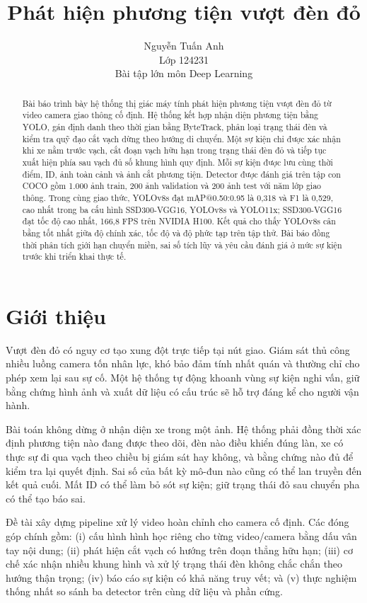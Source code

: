 \documentclass[11pt,a4paper]{article}
\title{Phát hiện phương tiện vượt đèn đỏ}
\author{Nguyễn Tuấn Anh \\
Lớp 124231 \\
Bài tập lớn môn Deep Learning}
\begin{document}
\maketitle
\pagestyle{plain}
\thispagestyle{plain}

\renewcommand{\abstractname}{Abstract}
\begin{abstract}
Bài báo trình bày hệ thống thị giác máy tính phát hiện phương tiện vượt đèn đỏ từ video camera giao thông cố định. Hệ thống kết hợp nhận diện phương tiện bằng YOLO, gán định danh theo thời gian bằng ByteTrack, phân loại trạng thái đèn và kiểm tra quỹ đạo cắt vạch dừng theo hướng di chuyển. Một sự kiện chỉ được xác nhận khi xe nằm trước vạch, cắt đoạn vạch hữu hạn trong trạng thái đèn đỏ và tiếp tục xuất hiện phía sau vạch đủ số khung hình quy định. Mỗi sự kiện được lưu cùng thời điểm, ID, ảnh toàn cảnh và ảnh cắt phương tiện. Detector được đánh giá trên tập con COCO gồm 1.000 ảnh train, 200 ảnh validation và 200 ảnh test với năm lớp giao thông. Trong cùng giao thức, YOLOv8s đạt mAP@0.50:0.95 là 0,318 và F1 là 0,529, cao nhất trong ba cấu hình SSD300-VGG16, YOLOv8s và YOLO11x; SSD300-VGG16 đạt tốc độ cao nhất, 166,8 FPS trên NVIDIA H100. Kết quả cho thấy YOLOv8s cân bằng tốt nhất giữa độ chính xác, tốc độ và độ phức tạp trên tập thử. Bài báo đồng thời phân tích giới hạn chuyển miền, sai số tích lũy và yêu cầu đánh giá ở mức sự kiện trước khi triển khai thực tế.
\end{abstract}

\section{Giới thiệu}
Vượt đèn đỏ có nguy cơ tạo xung đột trực tiếp tại nút giao. Giám sát thủ công nhiều luồng camera tốn nhân lực, khó bảo đảm tính nhất quán và thường chỉ cho phép xem lại sau sự cố. Một hệ thống tự động khoanh vùng sự kiện nghi vấn, giữ bằng chứng hình ảnh và xuất dữ liệu có cấu trúc sẽ hỗ trợ đáng kể cho người vận hành.

Bài toán không dừng ở nhận diện xe trong một ảnh. Hệ thống phải đồng thời xác định phương tiện nào đang được theo dõi, đèn nào điều khiển đúng làn, xe có thực sự đi qua vạch theo chiều bị giám sát hay không, và bằng chứng nào đủ để kiểm tra lại quyết định. Sai số của bất kỳ mô-đun nào cũng có thể lan truyền đến kết quả cuối. Mất ID có thể làm bỏ sót sự kiện; giữ trạng thái đỏ sau chuyển pha có thể tạo báo sai.

Đề tài xây dựng pipeline xử lý video hoàn chỉnh cho camera cố định. Các đóng góp chính gồm: (i) cấu hình hình học riêng cho từng video/camera bằng dấu vân tay nội dung; (ii) phát hiện cắt vạch có hướng trên đoạn thẳng hữu hạn; (iii) cơ chế xác nhận nhiều khung hình và xử lý trạng thái đèn không chắc chắn theo hướng thận trọng; (iv) báo cáo sự kiện có khả năng truy vết; và (v) thực nghiệm thống nhất so sánh ba detector trên cùng dữ liệu và phần cứng.
\end{document}
